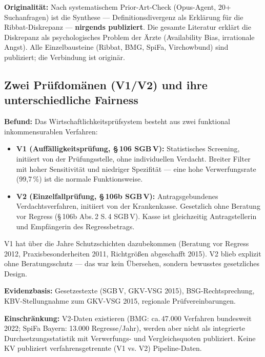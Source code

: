 \documentclass{umbruch-position}
\begin{document}
\textbf{Originalit\"at:} Nach systematischem Prior-Art-Check (Opus-Agent, 20+ Suchanfragen) ist die Synthese --- Definitionsdivergenz als Erkl\"arung f\"ur die Ribbat-Diskrepanz --- \textbf{nirgends publiziert}. Die gesamte Literatur erkl\"art die Diskrepanz als psychologisches Problem der \"Arzte (Availability Bias, irrationale Angst). Alle Einzelbausteine (Ribbat, BMG, SpiFa, Virchowbund) sind publiziert; die Verbindung ist origin\"ar.

\subsection{Zwei Pr\"ufdom\"anen (V1/V2) und ihre unterschiedliche Fairness}

\textbf{Befund:} Das Wirtschaftlichkeitspr\"ufsystem besteht aus zwei funktional inkommensurablen Verfahren:

\begin{itemize}
  \item \textbf{V1 (Auff\"alligkeitspr\"ufung, \S\,106 SGB\,V):} Statistisches Screening, initiiert von der Pr\"ufungsstelle, ohne individuellen Verdacht. Breiter Filter mit hoher Sensitivit\"at und niedriger Spezifit\"at --- eine hohe Verwerfungsrate (99,7\,\%) ist die normale Funktionsweise.
  \item \textbf{V2 (Einzelfallpr\"ufung, \S\,106b SGB\,V):} Antragsgebundenes Verdachtsverfahren, initiiert von der Krankenkasse. Gesetzlich ohne \glqq{}Beratung vor Regress\grqq{} (\S\,106b Abs.\,2 S.\,4 SGB\,V). Kasse ist gleichzeitig Antragstellerin und Empf\"angerin des Regressbetrags.
\end{itemize}

V1 hat \"uber die Jahre Schutzschichten dazubekommen (Beratung vor Regress 2012, Praxisbesonderheiten 2011, Richtgr\"o\ss{}en abgeschafft 2015). V2 blieb explizit ohne Beratungsschutz --- das war kein \"Ubersehen, sondern bewusstes gesetzliches Design.

\textbf{Evidenzbasis:} Gesetzestexte (SGB\,V, GKV-VSG 2015), BSG-Rechtsprechung, KBV-Stellungnahme zum GKV-VSG 2015, regionale Pr\"ufvereinbarungen.

\textbf{Einschr\"ankung:} V2-Daten existieren (BMG: ca.\,47.000 Verfahren bundesweit 2022; SpiFa Bayern: 13.000 Regresse/Jahr), werden aber nicht als integrierte Durchsetzungsstatistik mit Verwerfungs- und Vergleichsquoten publiziert. Keine KV publiziert verfahrensgetrennte (V1 vs. V2) Pipeline-Daten.
\end{document}
